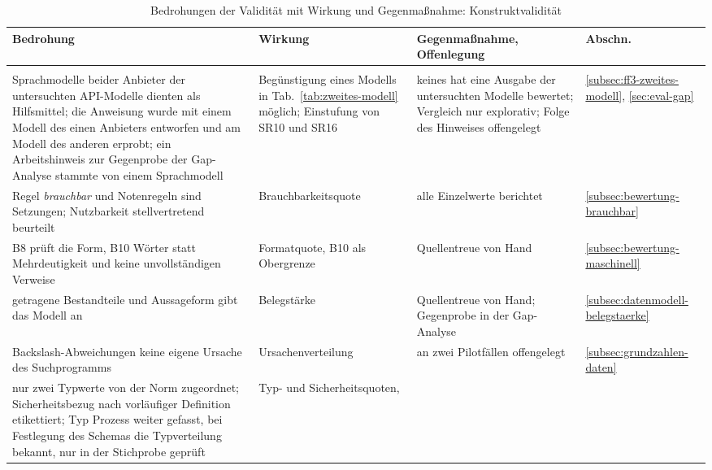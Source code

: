 \documentclass[11pt,a4paper]{report}
\begin{document}
\begin{table}[htbp]
  \centering
  \footnotesize
  \setlength{\tabcolsep}{4pt}
  \caption{Bedrohungen der Validität mit Wirkung und Gegenmaßnahme:
    Konstruktvalidität}
  \label{tab:validitaet}
  \begin{tabular}{@{}>{\raggedright\arraybackslash}p{4.75cm}%
                    >{\raggedright\arraybackslash}p{3.4cm}%
                    >{\raggedright\arraybackslash}p{3.8cm}%
                    >{\raggedright\arraybackslash}p{1.2cm}@{}}
    \toprule
    \textbf{Bedrohung} & \textbf{Wirkung} & \textbf{Gegenmaßnahme,
      Offenlegung} & \textbf{Abschn.} \\
    \midrule
    \multicolumn{4}{@{}l}{\textit{Konstruktvalidität}} \\
    Sprachmodelle beider Anbieter der untersuchten API-Modelle dienten
      als Hilfsmittel; die Anweisung wurde mit einem Modell des einen
      Anbieters entworfen und am Modell des anderen erprobt; ein
      Arbeitshinweis zur Gegenprobe der Gap-Analyse stammte von einem
      Sprachmodell &
      Begünstigung eines Modells in Tab.~\ref{tab:zweites-modell}
      möglich; Einstufung von SR10 und SR16 &
      keines hat eine Ausgabe der untersuchten Modelle bewertet; Vergleich
      nur explorativ; Folge des Hinweises offengelegt &
      \ref{subsec:ff3-zweites-modell}, \ref{sec:eval-gap} \\
    Regel \emph{brauchbar} und Notenregeln sind Setzungen; Nutzbarkeit
      stellvertretend beurteilt & Brauchbarkeitsquote &
      alle Einzelwerte berichtet & \ref{subsec:bewertung-brauchbar} \\
    B8 prüft die Form, B10 Wörter statt Mehrdeutigkeit und keine
      unvollständigen Verweise &
      Formatquote, B10 als Obergrenze &
      Quellentreue von Hand & \ref{subsec:bewertung-maschinell} \\
    getragene Bestandteile und Aussageform gibt das Modell an &
      Belegstärke & Quellentreue von Hand; Gegenprobe in der Gap-Analyse &
      \ref{subsec:datenmodell-belegstaerke} \\
    Backslash-Abweichungen keine eigene Ursache des Suchprogramms &
      Ursachenverteilung & an zwei Pilotfällen offengelegt &
      \ref{subsec:grundzahlen-daten} \\
    nur zwei Typwerte von der Norm zugeordnet; Sicherheitsbezug nach
      vorläufiger Definition etikettiert; Typ Prozess weiter gefasst, bei
      Festlegung des Schemas die Typverteilung bekannt, nur in der
      Stichprobe geprüft & Typ- und Sicherheitsquoten,

\end{tabular}
\end{table}
\end{document}
